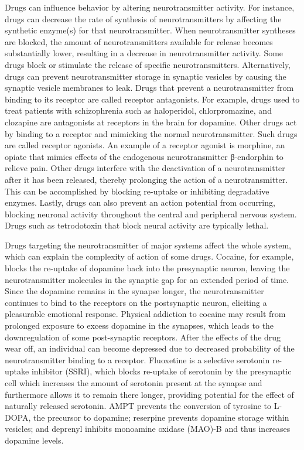 Drugs can influence behavior by altering neurotransmitter activity. For instance, drugs can decrease the rate of synthesis of neurotransmitters by affecting the synthetic enzyme(s) for that neurotransmitter. When neurotransmitter syntheses are blocked, the amount of neurotransmitters available for release becomes substantially lower, resulting in a decrease in neurotransmitter activity. Some drugs block or stimulate the release of specific neurotransmitters. Alternatively, drugs can prevent neurotransmitter storage in synaptic vesicles by causing the synaptic vesicle membranes to leak. Drugs that prevent a neurotransmitter from binding to its receptor are called receptor antagonists. For example, drugs used to treat patients with schizophrenia such as haloperidol, chlorpromazine, and clozapine are antagonists at receptors in the brain for dopamine. Other drugs act by binding to a receptor and mimicking the normal neurotransmitter. Such drugs are called receptor agonists. An example of a receptor agonist is morphine, an opiate that mimics effects of the endogenous neurotransmitter β-endorphin to relieve pain. Other drugs interfere with the deactivation of a neurotransmitter after it has been released, thereby prolonging the action of a neurotransmitter. This can be accomplished by blocking re-uptake or inhibiting degradative enzymes. Lastly, drugs can also prevent an action potential from occurring, blocking neuronal activity throughout the central and peripheral nervous system. Drugs such as tetrodotoxin that block neural activity are typically lethal.

Drugs targeting the neurotransmitter of major systems affect the whole system, which can explain the complexity of action of some drugs. Cocaine, for example, blocks the re-uptake of dopamine back into the presynaptic neuron, leaving the neurotransmitter molecules in the synaptic gap for an extended period of time. Since the dopamine remains in the synapse longer, the neurotransmitter continues to bind to the receptors on the postsynaptic neuron, eliciting a pleasurable emotional response. Physical addiction to cocaine may result from prolonged exposure to excess dopamine in the synapses, which leads to the downregulation of some post-synaptic receptors. After the effects of the drug wear off, an individual can become depressed due to decreased probability of the neurotransmitter binding to a receptor. Fluoxetine is a selective serotonin re-uptake inhibitor (SSRI), which blocks re-uptake of serotonin by the presynaptic cell which increases the amount of serotonin present at the synapse and furthermore allows it to remain there longer, providing potential for the effect of naturally released serotonin. AMPT prevents the conversion of tyrosine to L-DOPA, the precursor to dopamine; reserpine prevents dopamine storage within vesicles; and deprenyl inhibits monoamine oxidase (MAO)-B and thus increases dopamine levels.

